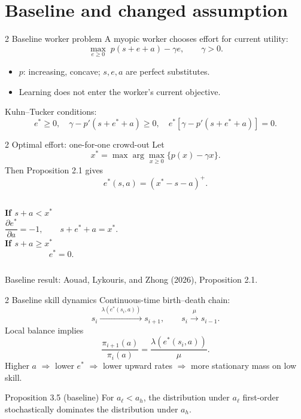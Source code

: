 \documentclass[aspectratio=169,11pt]{beamer}
\newcommand{\source}[1]{\vfill{\tiny\color{black!60}#1}}
\begin{document}
\section{Baseline and changed assumption}

\begin{frame}{2 \textperiodcentered{} Baseline worker problem}
  A myopic worker chooses effort for current utility:
  \[
    \max_{e\geq0}\; p(s+e+a)-\gamma e,
    \qquad \gamma>0.
  \]
  \begin{itemize}
    \item $p$: increasing, concave; $s,e,a$ are perfect substitutes.
    \item Learning does not enter the worker's current objective.
  \end{itemize}
  \vspace{0.4em}
  Kuhn--Tucker conditions:
  \[
    e^*\geq0,\quad \gamma-p'(s+e^*+a)\geq0,\quad
    e^*[\gamma-p'(s+e^*+a)]=0.
  \]
\end{frame}

\begin{frame}{2 \textperiodcentered{} Optimal effort: one-for-one crowd-out}
  Let
  \[
    x^*=\max\arg\max_{x\geq0}\{p(x)-\gamma x\}.
  \]
  Then Proposition 2.1 gives
  \[
    \boxed{e^*(s,a)=(x^*-s-a)^+.}
  \]
  \begin{columns}[T]
      \textbf{If $s+a<x^*$}
      \[
        \frac{\partial e^*}{\partial a}=-1,
        \qquad s+e^*+a=x^*.
      \]
      \textbf{If $s+a\geq x^*$}
      \[
        e^*=0.
      \]
  \end{columns}
  \source{Baseline result: Aouad, Lykouris, and Zhong (2026), Proposition 2.1.}
\end{frame}

\begin{frame}{2 \textperiodcentered{} Baseline skill dynamics}
  Continuous-time birth--death chain:
  \[
    s_i \xrightarrow{\ \lambda(e^*(s_i,a))\ } s_{i+1},
    \qquad
    s_i \xrightarrow{\ \mu\ } s_{i-1}.
  \]
  Local balance implies
  \[
    \frac{\pi_{i+1}(a)}{\pi_i(a)}
      =\frac{\lambda(e^*(s_i,a))}{\mu}.
  \]
  \vspace{0.4em}
  Higher $a$ $\Rightarrow$ lower $e^*$ $\Rightarrow$ lower upward rates
  $\Rightarrow$ more stationary mass on low skill.
  \begin{block}{Proposition 3.5 (baseline)}
    For $a_\ell<a_h$, the distribution under $a_\ell$ first-order
    stochastically dominates the distribution under $a_h$.
  \end{block}
\end{frame}
\end{document}
